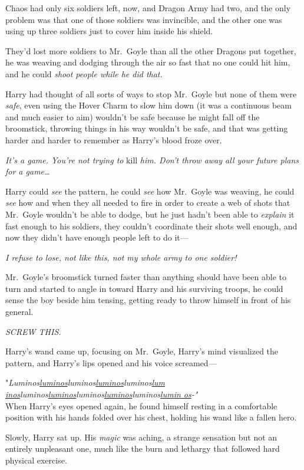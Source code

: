 Chaos had only six soldiers left, now, and Dragon Army had two, and the only 
problem was that one of those soldiers was invincible, and the other one was 
using up three soldiers just to cover him inside his shield.

They'd lost more soldiers to Mr.~Goyle than all the other Dragons put together, 
he was weaving and dodging through the air so fast that no one could hit him, 
and he could \emph{shoot people while he did that.}

Harry had thought of all sorts of ways to stop Mr.~Goyle but none of them were 
\emph{safe}, even using the Hover Charm to slow him down (it was a continuous 
beam and much easier to aim) wouldn't be safe because he might fall off the 
broomstick, throwing things in his way wouldn't be safe, and that was getting 
harder and harder to remember as Harry's blood froze over.

\emph{It's a game. You're not trying to} kill\emph{ him. Don't throw away all 
your future plans for a game{\ldots}}

Harry could \emph{see} the pattern, he could \emph{see} how Mr.~Goyle was 
weaving, he could \emph{see} how and when they all needed to fire in order to 
create a web of shots that Mr.~Goyle wouldn't be able to dodge, but he just 
hadn't been able to \emph{explain} it fast enough to his soldiers, they 
couldn't coordinate their shots well enough, and now they didn't have enough 
people left to do it---

\emph{I refuse to lose, not like this, not my whole army to one soldier!}

Mr.~Goyle's broomstick turned faster than anything should have been able to 
turn and started to angle in toward Harry and his surviving troops, he could 
sense the boy beside him tensing, getting ready to throw himself in front of 
his general.

\emph{SCREW THIS.}

Harry's wand came up, focusing on Mr.~Goyle, Harry's mind visualized the 
pattern, and Harry's lips opened and his voice screamed---

"\emph{Luminos\underline{luminos}luminos\underline{luminos}luminos\underline{lum
inos}luminos\underline{luminos}luminos\underline{luminos}luminos\underline{lumin
os}-"\\
}
\sbreak
When Harry's eyes opened again, he found himself resting in a comfortable 
position with his hands folded over his chest, holding his wand like a fallen 
hero.

Slowly, Harry sat up. His \emph{magic} was aching, a strange sensation but not 
an entirely unpleasant one, much like the burn and lethargy that followed hard 
physical exercise.

